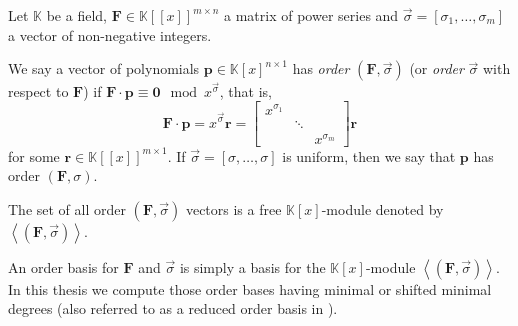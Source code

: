 Let $\mathbb{K}$ be a field, $\mathbf{F}\in\mathbb{K}\left[\left[x\right]\right]^{m\times n}$
a matrix of power series and $\vec{\sigma}=\left[\sigma_{1},\dots,\sigma_{m}\right]$
a vector of non-negative integers. 
\begin{defn}
We say a vector of polynomials $\mathbf{p}\in\mathbb{K}\left[x\right]^{n\times1}$
has \emph{order} $\left(\mathbf{F},\vec{\sigma}\right)$ (or \emph{order}
$\vec{\sigma}$ with respect to $\mathbf{F}$) if $\mathbf{F}\cdot\mathbf{p}\equiv\mathbf{0}\mod x^{\vec{\sigma}}$,
that is, 
\[
\mathbf{F}\cdot\mathbf{p}=x^{\vec{\sigma}}\mathbf{r}=\begin{bmatrix}x^{\sigma_{1}}\\
 & \ddots\\
 &  & x^{\sigma_{m}}
\end{bmatrix}\mathbf{r}
\]
 for some $\mathbf{r}\in\mathbb{K}\left[\left[x\right]\right]^{m\times1}$.
If $\vec{\sigma}=\left[\sigma,\dots,\sigma\right]$ is uniform, then
we say that $\mathbf{p}$ has order $\left(\mathbf{F},\sigma\right).$
\begin{comment}
The vector of power series $\mathbf{r}$ is called the order $\left(\mathbf{F},\sigma\right)$-residual
of \textbf{$\mathbf{p}$}. 
\end{comment}
{} The set of all order $\left(\mathbf{F},\vec{\sigma}\right)$ vectors
is a free $\mathbb{K}\left[x\right]$-module denoted by $\left\langle \left(\mathbf{F},\vec{\sigma}\right)\right\rangle $. 
\end{defn}
An order basis for $\mathbf{F}$ and $\vec{\sigma}$ is simply a basis
for the $\mathbb{K}\left[x\right]$-module $\left\langle \left(\mathbf{F},\vec{\sigma}\right)\right\rangle $.
In this thesis we compute those order bases having minimal or shifted
minimal degrees (also referred to as a reduced order basis in \citep{BL1997}).



